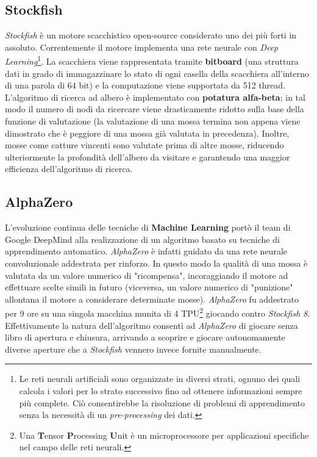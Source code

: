 \subsection{Stockfish}
\textit{Stockfish} è un motore scacchistico open-source considerato uno dei più forti in assoluto. Correntemente il motore implementa una rete neurale con \textit{Deep Learning}\footnote{Le reti neurali artificiali sono organizzate in diversi strati, ognuno dei quali calcola i valori per lo strato successivo fino ad ottenere informazioni sempre più complete. Ciò consentirebbe la risoluzione di problemi di apprendimento senza la necessità di un \textit{pre-processing} dei dati.}. 
La scacchiera viene rappresentata tramite \textbf{bitboard} (una struttura dati in grado di immagazzinare lo stato di ogni casella della scacchiera all’interno di una parola di 64 bit) e la computazione viene supportata da 512 thread. L'algoritmo di ricerca ad albero è implementato con \textbf{potatura alfa-beta}; in tal modo il numero di nodi da ricercare viene drasticamente ridotto sulla base della funzione di valutazione (la valutazione di una mossa termina non appena viene dimostrato che è peggiore di una mossa già valutata in precedenza). Inoltre, mosse come catture vincenti sono valutate prima di altre mosse, riducendo ulteriormente la profondità dell'albero da visitare e garantendo una maggior efficienza dell'algoritmo di ricerca.

\subsection{AlphaZero}
L'evoluzione continua delle tecniche di \textbf{Machine Learning} portò il team di Google DeepMind alla realizzazione di un algoritmo basato su tecniche di apprendimento automatico. \textit{AlphaZero} è infatti guidato da una rete neurale convoluzionale addestrata per rinforzo. In questo modo la qualità di una mossa è valutata da un valore numerico di "ricompensa", incoraggiando il motore ad effettuare scelte simili in futuro (viceversa, un valore numerico di "punizione" allontana il motore a considerare determinate mosse). \textit{AlphaZero} fu addestrato per 9 ore su una singola macchina munita di 4 TPU\footnote{Una \textbf{T}ensor \textbf{P}rocessing \textbf{U}nit è un microprocessore per applicazioni specifiche nel campo delle reti neurali.} giocando contro \textit{Stockfish 8}. Effettivamente la natura dell'algoritmo consentì ad \textit{AlphaZero} di giocare senza libro di apertura e chiusura, arrivando a scoprire e giocare autonomamente diverse aperture che a \textit{Stockfish} vennero invece fornite manualmente.





\newpage